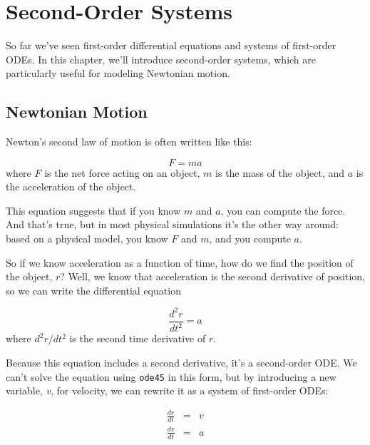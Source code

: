 \documentclass[../../book.tex]{subfiles}
\begin{document}
\chapter{Second-Order Systems}


So far we've seen first-order differential equations and systems of first-order ODEs.  In this chapter, we'll introduce second-order systems, which are particularly useful for modeling Newtonian motion.


\section{Newtonian Motion}
\label{s:newton}

Newton's second law of motion is often written like this:

\begin{equation*}
    F = m a
\end{equation*}
where $F$ is the net force acting on an object, $m$ is the
mass of the object, and $a$ is the acceleration of the object.

This equation suggests
that if you know $m$ and $a$, you can compute the force. And that's true,
but in most physical simulations it's the other way around: based on a
physical model, you know $F$ and $m$, and you compute $a$.


So if we know acceleration as a function of time, how do we
find the position of the object, $r$?  Well, we know that acceleration
is the second derivative of position, so we can write the differential
equation

\begin{equation*}
    \frac{d^2r}{dt^2} = a
\end{equation*}
where ${d^2r}/{dt^2}$ is the second time derivative of $r$.

Because this equation includes a second derivative, it's
a second-order ODE.  We can't solve the equation using \lstinline{ode45} in this form, but
by introducing a new variable, \emph{v}, for velocity, we can rewrite it
as a system of first-order ODEs:

\begin{eqnarray*}
    \frac{dr}{dt} &=& v   \\
    \frac{dv}{dt} &=& a
\end{eqnarray*}
\end{document}
